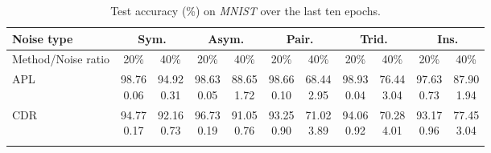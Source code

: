 \documentclass[11pt]{article}
\begin{document}
\begin{table}[!t]
    \small
\centering
	\begin{tabular}{l|cc|cc|cc|cc|cc} 
		\Xhline{3\arrayrulewidth}	 	
		   Noise type &\multicolumn{2}{c|}{Sym.}&\multicolumn{2}{c|}{Asym.}&\multicolumn{2}{c|}{Pair.}&\multicolumn{2}{c|}{Trid.}&\multicolumn{2}{c}{Ins.}\\
			\hline
		   Method/Noise ratio&  20\% & 40\%& 20\% & 40\% &20\% & 40\%& 20\% & 40\% & 20\% & 40\%\\
			\hline
			 APL& \makecell{98.76\\ \scriptsize{0.06}} & \makecell{94.92\\ \scriptsize{0.31}} & \makecell{98.63\\ \scriptsize{0.05}} & \makecell{88.65\\ \scriptsize{1.72}} & \makecell{98.66\\ \scriptsize{0.10}} & \makecell{68.44\\ \scriptsize{2.95}} & \makecell{98.93\\ \scriptsize{0.04}} & \makecell{76.44\\ \scriptsize{3.04}} & \makecell{97.63\\ \scriptsize{0.73}} & \makecell{87.90\\ \scriptsize{1.94}}\\
			\hline
			 CDR & \makecell{94.77\\ \scriptsize{0.17}} & \makecell{92.16\\ \scriptsize{0.73}} & \makecell{96.73\\ \scriptsize{0.19}} & \makecell{91.05\\ \scriptsize{0.76}} & \makecell{93.25\\ \scriptsize{0.90}} & \makecell{71.02\\ \scriptsize{3.89}} & \makecell{94.06\\ \scriptsize{0.92}} & \makecell{70.28\\ \scriptsize{4.01}} & \makecell{93.17\\ \scriptsize{0.96}} & \makecell{77.45\\ \scriptsize{3.04}}\\
		\Xhline{3\arrayrulewidth}
\end{tabular}
\caption
		{
Test accuracy (\%) on \textit{MNIST} over the last ten epochs.
		}
	\label{tab:com_mnist}
\end{table}		
\end{document}
